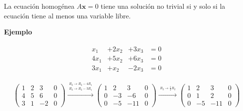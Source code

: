\documentclass{article}
\begin{document}
\begin{tcolorbox}[colback=blue!10!white,colframe=blue!60!black,title=Existencia y Unicidad]
    La ecuación homogénea $A\mathbf{x} = 0$ tiene una solución no trivial si y solo si la ecuación tiene al menos una variable libre.
\end{tcolorbox} 

\begin{large}
    \textbf{Ejemplo}
\end{large}

\begin{equation*}
    \begin{matrix}
        \begin{aligned}
            x_1 & +2x_2 & +3x_3 & =0\\
            4x_1 & +5x_2 & +6x_3 & =0\\
            3x_1 & +x_2 & -2x_3 & =0
        \end{aligned}
    \end{matrix}
\end{equation*}

\begin{equation*}
    \left(\begin{array}{rrr|r}
    1 & 2 & 3 & 0 \\
    4 & 5 & 6 & 0 \\
    3 & 1 & -2 & 0
    \end{array}\right) 
    \xrightarrow{\overset{\begin{aligned} R_2 \rightarrow R_2 - 4R_1 \\ R_3 \rightarrow R_3 - 3R_1\end{aligned}}{}} 
    \left(\begin{array}{rrr|r}
    1 & 2 & 3 & 0 \\
    0 & -3 & -6 & 0 \\
    0 & -5 & -11 & 0
    \end{array}\right)
    \xrightarrow{\overset{\begin{aligned} R_2 \rightarrow \frac{1}{3} R_2 \end{aligned}}{}} 
    \left(\begin{array}{rrr|r}
    1 & 2 & 3 & 0 \\
    0 & 1 & 2 & 0 \\
    0 & -5 & -11 & 0
    \end{array}\right)
\end{equation*}
\end{document}
